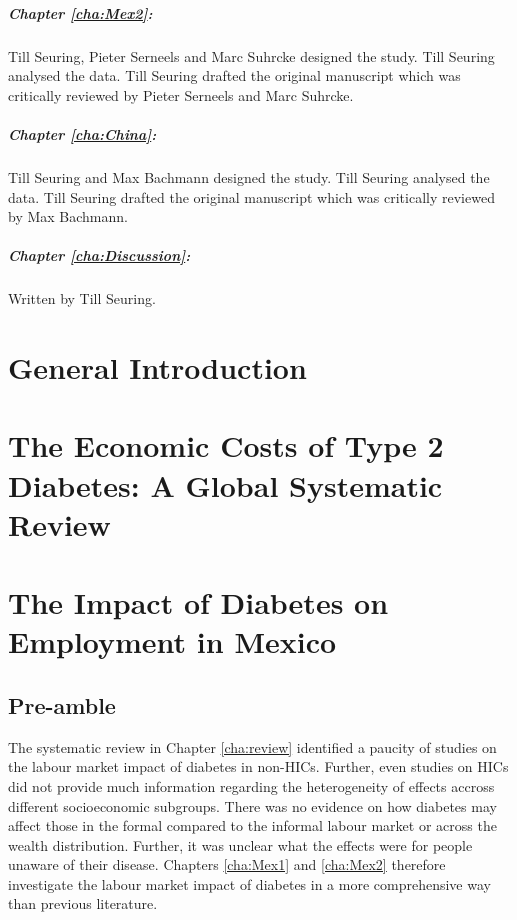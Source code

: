 \paragraph{Chapter \ref{cha:Mex2}:} Till Seuring, Pieter Serneels and Marc Suhrcke designed the study. Till Seuring analysed the data. Till Seuring drafted the original manuscript which was critically reviewed by Pieter Serneels and Marc Suhrcke.

\paragraph{Chapter \ref{cha:China}:} Till Seuring and Max Bachmann designed the study. Till Seuring analysed the data. Till Seuring drafted the original manuscript which was critically reviewed by Max Bachmann.

\paragraph{Chapter \ref{cha:Discussion}:} Written by Till Seuring.



\chapter{\label{cha:intro}General Introduction}

\acresetall  %
\chapter{\label{cha:review}The Economic Costs of Type 2 Diabetes: A Global Systematic Review}

\acresetall  %
\chapter{\label{cha:Mex1}The Impact of Diabetes on Employment in Mexico}
\section*{Pre-amble}

The systematic review in Chapter \ref{cha:review} identified a paucity of studies on the labour market impact of diabetes in non-\acp{HIC}. Further, even studies on \acp{HIC} did not provide much information regarding the heterogeneity of effects accross different socioeconomic subgroups. There was no evidence on how diabetes may affect those in the formal compared to the informal labour market or across the wealth distribution. Further, it was unclear what the effects were for people unaware of their disease. Chapters \ref{cha:Mex1} and \ref{cha:Mex2} therefore investigate the labour market impact of diabetes in a more comprehensive way than previous literature.

